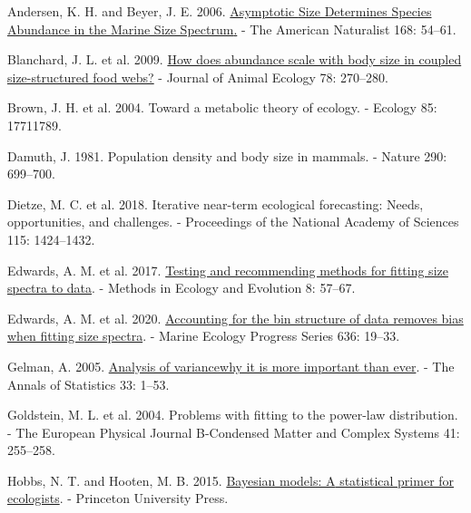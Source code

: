 \documentclass[
  12pt,
]{article}
\newlength{\cslhangindent}
\newlength{\cslentryspacingunit} %
\newenvironment{CSLReferences}[2] %
 {%
  \setlength{\parindent}{0pt}
  \ifodd #1
  \let\oldpar\par
  \def\par{\hangindent=\cslhangindent\oldpar}
  \fi
  \setlength{\parskip}{#2\cslentryspacingunit}
 }%
 {}
\begin{document}
\hypertarget{refs}{}
\begin{CSLReferences}{1}{0}
\leavevmode{}%
Andersen, K. H. and Beyer, J. E. 2006.
\href{https://doi.org/10.1086/504849}{Asymptotic {Size Determines
Species Abundance} in the {Marine Size Spectrum}.} - The American
Naturalist 168: 54--61.

\leavevmode{}%
Blanchard, J. L. et al. 2009.
\href{https://doi.org/10.1111/j.1365-2656.2008.01466.x}{How does
abundance scale with body size in coupled size-structured food webs?} -
Journal of Animal Ecology 78: 270--280.

\leavevmode{}%
Brown, J. H. et al. 2004. Toward a metabolic theory of ecology. -
Ecology 85: 17711789.

\leavevmode{}%
Damuth, J. 1981. Population density and body size in mammals. - Nature
290: 699--700.

\leavevmode{}%
Dietze, M. C. et al. 2018. Iterative near-term ecological forecasting:
Needs, opportunities, and challenges. - Proceedings of the National
Academy of Sciences 115: 1424--1432.

\leavevmode{}%
Edwards, A. M. et al. 2017.
\href{https://doi.org/10.1111/2041-210X.12641}{Testing and recommending
methods for fitting size spectra to data}. - Methods in Ecology and
Evolution 8: 57--67.

\leavevmode{}%
Edwards, A. M. et al. 2020.
\href{https://doi.org/10.3354/meps13230}{Accounting for the bin
structure of data removes bias when fitting size spectra}. - Marine
Ecology Progress Series 636: 19--33.

\leavevmode{}%
Gelman, A. 2005.
\href{https://doi.org/10.1214/009053604000001048}{Analysis of
variance\textemdash why it is more important than ever}. - The Annals of
Statistics 33: 1--53.

\leavevmode{}%
Goldstein, M. L. et al. 2004. Problems with fitting to the power-law
distribution. - The European Physical Journal B-Condensed Matter and
Complex Systems 41: 255--258.

\leavevmode{}%
Hobbs, N. T. and Hooten, M. B. 2015.
\href{https://doi.org/10.23943/princeton/9780691159287.001.0001}{Bayesian
models: {A} statistical primer for ecologists}. - {Princeton University
Press}.


\end{CSLReferences}
\end{document}
